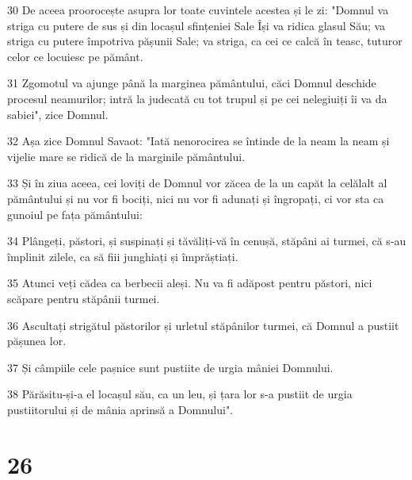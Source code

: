 \par 30 De aceea proorocește asupra lor toate cuvintele acestea și le zi: "Domnul va striga cu putere de sus și din locașul sfințeniei Sale Își va ridica glasul Său; va striga cu putere împotriva pășunii Sale; va striga, ca cei ce calcă în teasc, tuturor celor ce locuiesc pe pământ.
\par 31 Zgomotul va ajunge până la marginea pământului, căci Domnul deschide procesul neamurilor; intră la judecată cu tot trupul și pe cei nelegiuiți îi va da sabiei", zice Domnul.
\par 32 Așa zice Domnul Savaot: "Iată nenorocirea se întinde de la neam la neam și vijelie mare se ridică de la marginile pământului.
\par 33 Și în ziua aceea, cei loviți de Domnul vor zăcea de la un capăt la celălalt al pământului și nu vor fi bociți, nici nu vor fi adunați și îngropați, ci vor sta ca gunoiul pe fața pământului:
\par 34 Plângeți, păstori, și suspinați și tăvăliți-vă în cenușă, stăpâni ai turmei, că s-au împlinit zilele, ca să fiii junghiați și împrăștiați.
\par 35 Atunci veți cădea ca berbecii aleși. Nu va fi adăpost pentru păstori, nici scăpare pentru stăpânii turmei.
\par 36 Ascultați strigătul păstorilor și urletul stăpânilor turmei, că Domnul a pustiit pășunea lor.
\par 37 Și câmpiile cele pașnice sunt pustiite de urgia mâniei Domnului.
\par 38 Părăsitu-și-a el locașul său, ca un leu, și țara lor s-a pustiit de urgia pustiitorului și de mânia aprinsă a Domnului".

\chapter{26}

